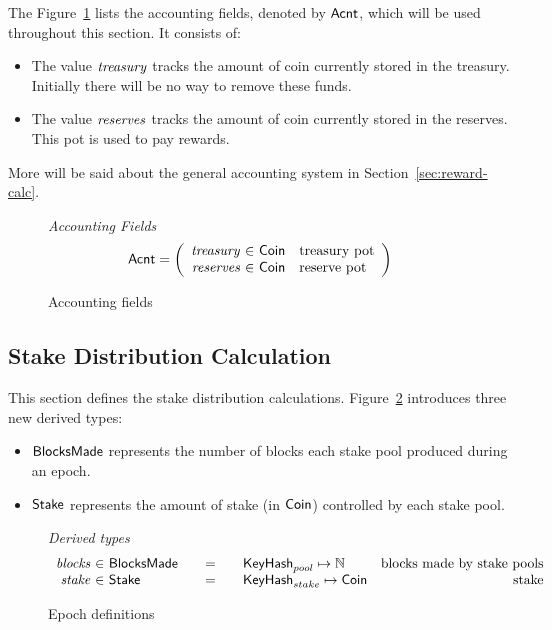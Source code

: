 The Figure~\ref{fig:defs:accounting} lists the accounting fields, denoted by $\mathsf{Acnt}$,
which will be used throughout this section. It consists of:
\begin{itemize}
  \item The value $\mathit{treasury}$ tracks the amount of coin currently stored in the treasury.
    Initially there will be no way to remove these funds.
  \item The value $\mathit{reserves}$ tracks the amount of coin currently stored in the reserves.
    This pot is used to pay rewards.
\end{itemize}
More will be said about the general accounting system in Section~\ref{sec:reward-calc}.

\begin{figure}[htb]
  \emph{Accounting Fields}
  \begin{equation*}
    \Acnt =
    \left(
      \begin{array}{r@{~\in~}ll}
        \var{treasury} & \Coin & \text{treasury pot}\\
        \var{reserves} & \Coin & \text{reserve pot}\\
      \end{array}
    \right)
  \end{equation*}
  \caption{Accounting fields}
  \label{fig:defs:accounting}
\end{figure}


\subsection{Stake Distribution Calculation}
\label{sec:stake-dist-calc}

This section defines the stake distribution calculations.
Figure~\ref{fig:epoch-defs} introduces three new derived types:
\begin{itemize}
  \item $\mathsf{BlocksMade}$ represents the number of blocks each stake pool produced
    during an epoch.
  \item $\mathsf{Stake}$ represents the amount of stake (in $\mathsf{Coin}$) controlled by each
    stake pool.
\end{itemize}

\begin{figure}[htb]
  \emph{Derived types}
  \begin{equation*}
    \begin{array}{r@{~\in~}l@{\qquad=\qquad}lr}
      \var{blocks}
      & \BlocksMade
      & \KeyHash_{pool} \mapsto \N
      & \text{blocks made by stake pools} \\
      \var{stake}
      & \Stake
      & \KeyHash_{stake} \mapsto \Coin
      & \text{stake} \\
    \end{array}
  \end{equation*}
  \caption{Epoch definitions}
  \label{fig:epoch-defs}
\end{figure}

